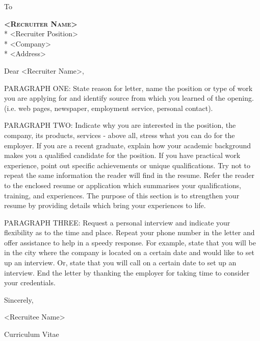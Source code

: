 \documentclass{cv}
\begin{document}

\phantom{}

\vspace{1.5cm}

To

\textbf{\textsc{<Recruiter Name>}} \\*
<Recruiter Position>               \\*
<Company>                          \\*
<Address>

\vspace{2cm}

Dear <Recruiter Name>,

\vspace{1cm}

PARAGRAPH ONE: State reason for letter, name the position
or type of work you are applying for and identify source
from which you learned of the opening. (i.e. web pages, newspaper,
employment service, personal contact).

\vspace{0.5cm}

PARAGRAPH TWO: Indicate why you are interested in the position,
the company, its products, services - above all, stress what you
can do for the employer. If you are a recent graduate, explain
how your academic background makes you a qualified candidate for
the position. If you have practical work experience, point out
specific achievements or unique qualifications. Try not to repeat
the same information the reader will find in the resume. Refer
the reader to the enclosed resume or application which summarises
your qualifications, training, and experiences. The purpose of this
section is to strengthen your resume by providing details which
bring your experiences to life.

\vspace{0.5cm}

PARAGRAPH THREE: Request a personal interview and indicate your
flexibility as to the time and place. Repeat your phone number
in the letter and offer assistance to help in a speedy response.
For example, state that you will be in the city where the company
is located on a certain date and would like to set up an interview.
Or, state that you will call on a certain date to set up an interview.
End the letter by thanking the employer for taking time to consider
your credentials.

\vspace{1.0cm}

Sincerely,

\vspace{0.2cm}

<Recruitee Name>

\vspace{1.0cm}

\faPaperclip \hspace{0.5em} Curriculum Vitae
\end{document}
